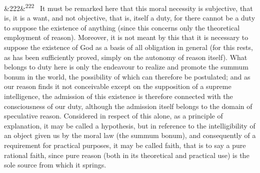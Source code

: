 \documentclass[12pt]{article}
\newcommand{\para}[1][]{\par\noindent\ifx&#1&\else\textsuperscript{\footnotesize #1}~\fi}
\begin{document}
\para[222] It must be remarked here that this moral necessity is subjective, that is, it is a want, and not objective, that is, itself a duty, for there cannot be a duty to suppose the existence of anything (since this concerns only the theoretical employment of reason). Moreover, it is not meant by this that it is necessary to suppose the existence of God as a basis of all obligation in general (for this rests, as has been sufficiently proved, simply on the autonomy of reason itself). What belongs to duty here is only the endeavour to realize and promote the summum bonum in the world, the possibility of which can therefore be postulated; and as our reason finds it not conceivable except on the supposition of a supreme intelligence, the admission of this existence is therefore connected with the consciousness of our duty, although the admission itself belongs to the domain of speculative reason. Considered in respect of this alone, as a principle of explanation, it may be called a hypothesis, but in reference to the intelligibility of an object given us by the moral law (the summum bonum), and consequently of a requirement for practical purposes, it may be called faith, that is to say a pure rational faith, since pure reason (both in its theoretical and practical use) is the sole source from which it springs.
\end{document}
